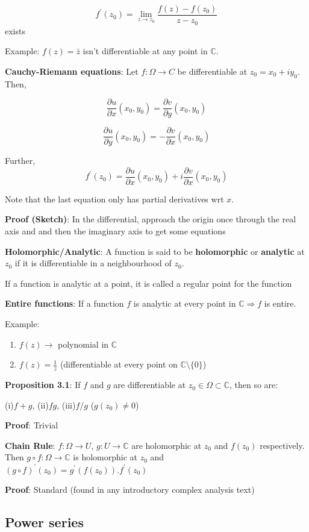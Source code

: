 \documentclass{article}
\begin{document}
\begin{flushleft}
$$f^{'}(z_0)= \lim_{z \to z_0} \frac{f(z)-f(z_0)}{z-z_0}$$ exists 

Example: $f(z)=\bar{z}$ isn't differentiable at any point in $\mathds{C}$.

\textbf{Cauchy-Riemann equations}: Let $f:\Omega \rightarrow C$ be differentiable at $z_0=x_0+iy_0$. Then,

$$\frac{\partial u}{\partial x}(x_0,y_0)=\frac{\partial v}{\partial y}(x_0,y_0)$$

$$\frac{\partial u}{\partial y}(x_0,y_0)= -\frac{\partial v}{\partial x}(x_0,y_0)$$

Further, $$f^{'}(z_0)= \frac{\partial u}{\partial x}(x_0,y_0)+i\frac{\partial v}{\partial x}(x_0,y_0)$$

Note that the last equation only has partial derivatives wrt $x$.

\textbf{Proof (Sketch)}: In the differential, approach the origin once through the real axis and and then the imaginary axis to get some equations  

\textbf{Holomorphic/Analytic}: A function is said to be \textbf{holomorphic} or \textbf{analytic} at $z_0$ if it is differentiable in a neighbourhood of $z_0$. 

If a function is analytic at a point, it is called a regular point for the function 

\textbf{Entire functions}: If a function $f$ is analytic at every point in $\mathds{C}\Rightarrow f$ is entire.

Example: 
\begin{enumerate}
\item $f(z)\rightarrow$ polynomial in $\mathds{C}$ 
\item$f(z)=\frac{1}{z}$ (differentiable at every point on $\mathds{C}\setminus \{0\}$)
\end{enumerate}
\textbf{Proposition 3.1}: If $f$ and $g$ are differentiable at $z_0\in \Omega \subset \mathds{C}$, then so are:

(i)$f+g$, (ii)$fg$, (iii)$f/g$ ($g(z_0)\neq 0$)

\textbf{Proof}: Trivial

\textbf{Chain Rule}: $f:\Omega \rightarrow U$, $g:U\rightarrow \mathds{C}$ are holomorphic at $z_0$ and $f(z_0)$ respectively.
Then $g\circ f:\Omega\rightarrow \mathds{C}$ is holomorphic at $z_0$ and $(g\circ f)^{'}(z_0)=g^{'}(f(z_0)).f^{'}(z_0)$

\textbf{Proof}: Standard (found in any introductory complex analysis text)

\subsection{\textbf{Power series}} 


\end{flushleft}
\end{document}
